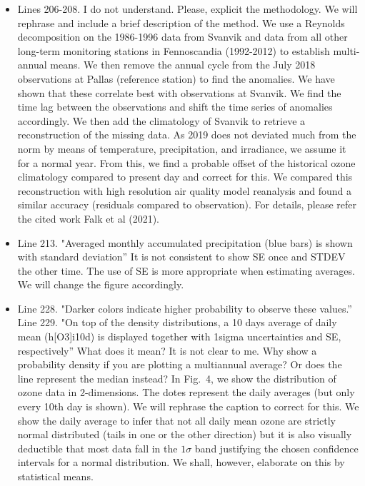 \documentclass{scrartcl}
\begin{document}
\begin{itemize}
\item {\color{blue}Lines 206-208. I do not understand. Please, explicit the methodology.}
We will rephrase and include a brief description of the method. We use a Reynolds decomposition on the 1986-1996 data from Svanvik and data from all other long-term monitoring stations in Fennoscandia (1992-2012) to establish multi-annual means. We then remove the annual cycle from the July 2018 observations at Pallas (reference station) to find the anomalies. We have shown that these correlate best with observations at Svanvik. We find the time lag between the observations and shift the time series of anomalies accordingly. We then add the climatology of Svanvik to retrieve a reconstruction of the missing data. As 2019 does not deviated much from the norm by means of temperature, precipitation, and irradiance, we assume it for a normal year. From this, we find a probable offset of the historical ozone climatology compared to present day and correct for this. We compared this reconstruction with high resolution air quality model reanalysis and found a similar accuracy (residuals compared to observation). For details, please refer the cited work Falk et al (2021).

\item {\color{blue}Line 213. "Averaged monthly accumulated precipitation (blue bars) is shown with standard deviation” It is not consistent to show SE once and STDEV the other time. The use of SE is more appropriate when estimating averages.}
We will change the figure accordingly.

\item {\color{blue}Line 228. "Darker colors indicate higher probability to observe these values.”\\Line 229. "On top of the density distributions, a 10 days average of daily mean (h[O3]i10d) is displayed together with 1sigma uncertainties and SE, respectively” What does it mean? It is not clear to me. Why show a probability density if you are plotting a multiannual average? Or does the line represent the median instead?} In Fig.~4, we show the distribution of ozone data in 2-dimensions. The dotes represent the daily averages (but only every 10th day is shown). We will rephrase the caption to correct for this. We show the daily average to infer that not all daily mean ozone are strictly normal distributed (tails in one or the other direction) but it is also visually deductible that most data fall in the $1\sigma$ band justifying the chosen confidence intervals for a normal distribution. We shall, however, elaborate on this by statistical means.  


\end{itemize}
\end{document}
